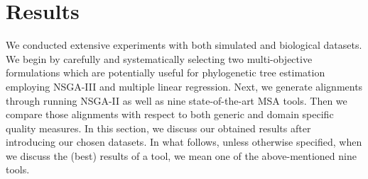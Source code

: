 \section{Results}
\label{sec:results}


We conducted extensive experiments with both simulated and biological datasets. We begin by carefully and systematically selecting two multi-objective formulations which are potentially useful for phylogenetic tree estimation employing NSGA-III and multiple linear regression. Next, we generate alignments through running NSGA-II as well as nine state-of-the-art MSA tools. Then we compare those alignments with respect to both generic and domain specific quality measures. In this section, we discuss our obtained results after introducing our chosen datasets. In what follows, unless otherwise specified, when we discuss the (best) results of a tool, we mean one of the above-mentioned nine tools.

